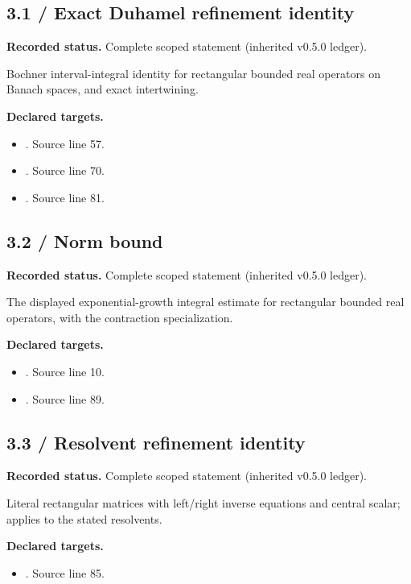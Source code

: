 \subsection{3.1 / Exact Duhamel refinement identity}
\label{result:3.1}
\textbf{Recorded status.} Complete scoped statement (inherited v0.5.0 ledger).\par
Bochner interval-integral identity for rectangular bounded real operators on Banach spaces, and exact intertwining.

\textbf{Declared targets.}\begin{itemize}
\item {}. Source line 57.
\item {}. Source line 70.
\item {}. Source line 81.
\end{itemize}
\subsection{3.2 / Norm bound}
\label{result:3.2}
\textbf{Recorded status.} Complete scoped statement (inherited v0.5.0 ledger).\par
The displayed exponential-growth integral estimate for rectangular bounded real operators, with the contraction specialization.

\textbf{Declared targets.}\begin{itemize}
\item {}. Source line 10.
\item {}. Source line 89.
\end{itemize}
\subsection{3.3 / Resolvent refinement identity}
\label{result:3.3}
\textbf{Recorded status.} Complete scoped statement (inherited v0.5.0 ledger).\par
Literal rectangular matrices with left/right inverse equations and central scalar; applies to the stated resolvents.

\textbf{Declared targets.}\begin{itemize}
\item {}. Source line 85.
\end{itemize}
